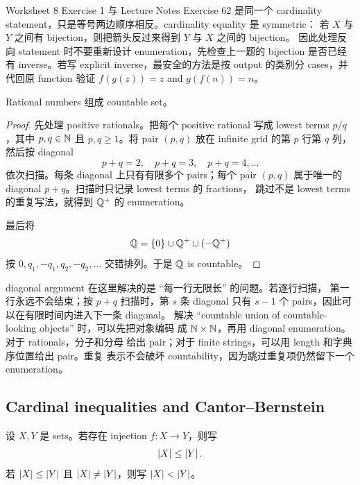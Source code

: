 \begin{explanation}
Worksheet 8 Exercise 1 与 Lecture Notes Exercise 62 是同一个 cardinality
statement，只是等号两边顺序相反。cardinality equality 是 symmetric：
若 \(X\) 与 \(Y\) 之间有 bijection，则把箭头反过来得到 \(Y\) 与 \(X\)
之间的 bijection。
因此处理反向 statement 时不要重新设计 enumeration，先检查上一题的
bijection 是否已经有 inverse。若写 explicit inverse，最安全的方法是按
output 的类别分 cases，并代回原 function 验证 \(f(g(z))=z\) and
\(g(f(n))=n\)。
\end{explanation}

\begin{theorem}[\(\Q\) is countable]
Rational numbers 组成 countable set。
\end{theorem}

\begin{proof}
先处理 positive rationals。把每个 positive rational 写成 lowest terms
\(p/q\)，其中 \(p,q\in\mathbb{N}\) 且 \(p,q\ge 1\)。将 pair \((p,q)\) 放在
infinite grid 的第 \(p\) 行第 \(q\) 列，然后按 diagonal
\[
  p+q=2,\quad p+q=3,\quad p+q=4,\ldots
\]
依次扫描。每条 diagonal 上只有有限多个 pairs；每个 pair \((p,q)\)
属于唯一的 diagonal \(p+q\)。扫描时只记录 lowest terms 的 fractions，
跳过不是 lowest terms 的重复写法，就得到 \(\mathbb{Q}^+\) 的 enumeration。

最后将
\[
  \mathbb{Q}=\{0\}\cup \mathbb{Q}^+\cup(-\mathbb{Q}^+)
\]
按 \(0,q_1,-q_1,q_2,-q_2,\ldots\) 交错排列。于是 \(\Q\) is countable。
\end{proof}

\begin{explanation}
diagonal argument 在这里解决的是 ``每一行无限长'' 的问题。若逐行扫描，
第一行永远不会结束；按 \(p+q\) 扫描时，第 \(s\) 条 diagonal 只有
\(s-1\) 个 pairs，因此可以在有限时间内进入下一条 diagonal。
解决 ``countable union of countable-looking objects'' 时，可以先把对象编码
成 \(\mathbb{N}\times\mathbb{N}\)，再用 diagonal enumeration。对于 rationals，分子和分母
给出 pair；对于 finite strings，可以用 length 和字典序位置给出 pair。重复
表示不会破坏 countability，因为跳过重复项仍然留下一个 enumeration。
\end{explanation}

\subsection{Cardinal inequalities and Cantor--Bernstein}

\begin{definition}
设 \(X,Y\) 是 sets。若存在 injection \(f:X\to Y\)，则写
\[
  \left|X\right|\le \left|Y\right|.
\]
若 \(\left|X\right|\le\left|Y\right|\) 且 \(\left|X\right|\ne\left|Y\right|\)，则写
\(\left|X\right|<\left|Y\right|\)。
\end{definition}

